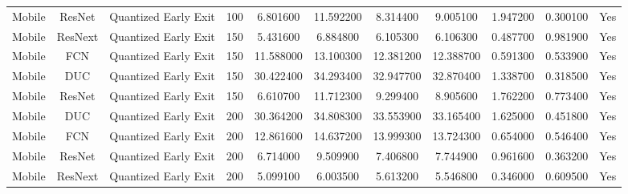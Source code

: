 \begin{tabular}{|c||c||c||c||c||c||c||c||c||c||c|}
Mobile & ResNet & Quantized Early Exit & 100 & 6.801600 & 11.592200 & 8.314400 & 9.005100 & 1.947200 & 0.300100 & Yes \\
Mobile & ResNext & Quantized Early Exit & 150 & 5.431600 & 6.884800 & 6.105300 & 6.106300 & 0.487700 & 0.981900 & Yes \\
Mobile & FCN & Quantized Early Exit & 150 & 11.588000 & 13.100300 & 12.381200 & 12.388700 & 0.591300 & 0.533900 & Yes \\
Mobile & DUC & Quantized Early Exit & 150 & 30.422400 & 34.293400 & 32.947700 & 32.870400 & 1.338700 & 0.318500 & Yes \\
Mobile & ResNet & Quantized Early Exit & 150 & 6.610700 & 11.712300 & 9.299400 & 8.905600 & 1.762200 & 0.773400 & Yes \\
Mobile & DUC & Quantized Early Exit & 200 & 30.364200 & 34.808300 & 33.553900 & 33.165400 & 1.625000 & 0.451800 & Yes \\
Mobile & FCN & Quantized Early Exit & 200 & 12.861600 & 14.637200 & 13.999300 & 13.724300 & 0.654000 & 0.546400 & Yes \\
Mobile & ResNet & Quantized Early Exit & 200 & 6.714000 & 9.509900 & 7.406800 & 7.744900 & 0.961600 & 0.363200 & Yes \\
Mobile & ResNext & Quantized Early Exit & 200 & 5.099100 & 6.003500 & 5.613200 & 5.546800 & 0.346000 & 0.609500 & Yes \\
\bottomrule
\end{tabular}
